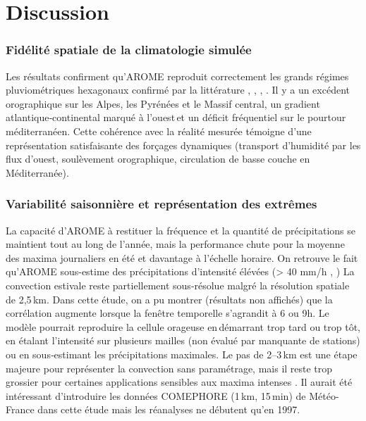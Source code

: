 \documentclass[
  article,
  nofooter,
  noheadings]{jss}
\begin{document}
\section{Discussion}\label{discussion}

\subsubsection{Fidélité spatiale de la climatologie
simulée}\label{fiduxe9lituxe9-spatiale-de-la-climatologie-simuluxe9e}

Les résultats confirment qu'AROME reproduit correctement les grands
régimes pluviométriques hexagonaux confirmé par la littérature
\citep{Fumiere2020}, \citep{caillaud2021simulation},
\citep{hess-28-2579-2024}, \citep{LucasPicher2024}. Il y a un excédent
orographique sur les Alpes, les Pyrénées et le Massif central, un
gradient atlantique‑continental marqué à l'ouest\,et un déficit
fréquentiel sur le pourtour méditerranéen. Cette cohérence avec la
réalité mesurée témoigne d'une représentation satisfaisante des forçages
dynamiques (transport d'humidité par les flux d'ouest, soulèvement
orographique, circulation de basse couche en Méditerranée).

\subsubsection{Variabilité saisonnière et représentation des
extrêmes}\label{variabilituxe9-saisonniuxe8re-et-repruxe9sentation-des-extruxeames}

La capacité d'AROME à restituer la fréquence et la quantité de
précipitations se maintient tout au long de l'année, mais la performance
chute pour la moyenne des maxima journaliers en été et davantage à
l'échelle horaire. On retrouve le fait qu'AROME sous-estime des
précipitations d'intensité élévées (\textgreater{} 40 mm/h
\citep{Caillaud2021}, \citep{poncet2024convection}) La convection
estivale reste partiellement sous‑résolue malgré la résolution spatiale
de 2,5\,km. Dans cette étude, on a pu montrer (résultats non affichés)
que la corrélation augmente lorsque la fenêtre temporelle s'agrandit à 6
ou 9h. Le modèle pourrait reproduire la cellule orageuse en\,démarrant
trop tard ou trop tôt, en étalant l'intensité sur plusieurs mailles (non
évalué par manquante de stations) ou en sous‑estimant les précipitations
maximales. Le pas de 2--3\,km est une étape majeure pour représenter la
convection sans paramétrage, mais il reste trop grossier pour certaines
applications sensibles aux maxima intenses \citep{Prein2015Review}. Il
aurait été intéressant d'introduire les données COMEPHORE (1\,km,
15\,min) de Météo-France dans cette étude mais les réanalyses ne
débutent qu'en 1997.
\end{document}
